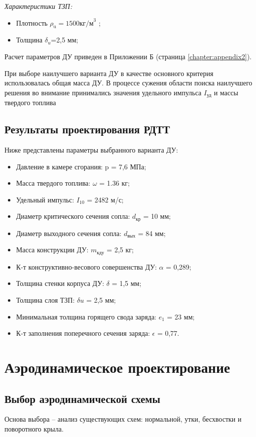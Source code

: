\emph{Характеристики ТЗП:}

\begin{itemize}
	\item Плотность $\rho_\text{u}=1500  \text{кг/м}^3$ ;
	\item Толщина $\delta_u$=2,5 мм;
\end{itemize}

Расчет параметров ДУ приведен в Приложении Б (страница \ref{chapter:appendix2}).

При выборе наилучшего варианта ДУ в качестве основного критерия использовалась общая масса ДУ. В процессе сужения области поиска наилучшего решения во внимание принимались значения удельного импульса $I_{\text{уд}}$ и массы твердого топлива

\subsection{Результаты проектирования РДТТ}
Ниже представлены параметры выбранного варианта ДУ:
\begin{itemize}
	\item Давление в камере сгорания:				p = 7,6 МПа;
	\item Масса твердого топлива:					$\omega$ = 1.36 кг; 
	\item Удельный импульс:						$I_{10}$ = 2482 м/с; 
	\item Диаметр критического сечения сопла:			$d_{\text{кр}}$ = 10  мм; 
	\item Диаметр выходного сечения сопла:				$d_{\text{вых}}$ = 84 мм;
	\item Масса конструкции ДУ:					$m_{\text{кду}}$ = 2,5 кг; 
	\item К-т конструктивно-весового совершенства ДУ:		$\alpha$ = 0,289; 
	\item Толщина стенки корпуса ДУ:					$\delta$ = 1,5 мм; 
	\item Толщина слоя ТЗП:						$\delta u$ = 2,5 мм; 
	\item Минимальная толщина горящего свода заряда:		$e_1$ = 23 мм;
	\item К-т заполнения поперечного сечения заряда:		$\epsilon$ = 0,77.
\end{itemize}


\clearpage
\section{Аэродинамическое проектирование}
\subsection{Выбор аэродинамической схемы}
Основа выбора – анализ существующих схем: нормальной, утки, бесхвостки и поворотного крыла.

